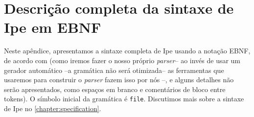 \chapter{Descrição completa da sintaxe de Ipe em EBNF}
\label{apendix:ebnf-syntax}

Neste apêndice, apresentamos a sintaxe completa de
Ipe usando a notação EBNF, de acordo com \cite{ebnfstandard} (como iremos fazer
o nosso próprio \textit{parser}-- ao invés de usar um gerador automático --a
gramática não será otimizada-- as ferramentas que usaremos para construir o
\textit{parser} fazem isso por nós --, e alguns detalhes não serão apresentados,
como espaços em branco e comentários de bloco entre tokens). O símbolo inicial
da gramática é \texttt{file}. Discutimos mais sobre a sintaxe de Ipe no
\autoref{chapter:specification}.

